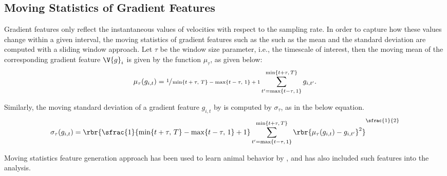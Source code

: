 \subsection{Moving Statistics of Gradient Features}
Gradient features only reflect the instantaneous values of velocities with respect to the sampling rate.
In order to capture how these values change within a given interval, the moving statistics of gradient features such as the such as the mean and the standard deviation are  computed with a sliding window approach.
Let $\tau$ be the window size parameter, i.e., the timescale of interest, then the moving mean of the corresponding gradient feature $\V{g}_{i}$ is given by the function $\mu_\tau$, as given below:
\begin{equation}
	\mu_{\tau}(g_{i,t}) = \sfrac{1}{\min\{t+\tau,\, T\}-\max\{t-\tau,\, 1\}+1} \sum_{t^{\prime}=\max\{t-\tau,\, 1\}}^{\min\{t+\tau,\, T\}} g_{i, t^{\prime}}.
\end{equation}

Similarly, the moving standard deviation of a gradient feature $g_{i,t}$ by is computed by $\sigma_\tau$, as in the below equation.
\begin{equation}
	\sigma_\tau(g_{i,t}) = \rbr{\sfrac{1}{\min\{t+\tau,\, T\}-\max\{t-\tau,\, 1\}+1} \sum_{t^{\prime}=\max\{t-\tau,\, 1\}}^{\min\{t+\tau,\, T\}} \rbr{\mu_{\tau}(g_{i,t}) - g_{i, t^{\prime}}}^2}^{\sfrac{1}{2}}
\end{equation}

Moving statistics feature generation approach has been used to learn animal behavior by \citet{kabra_jaaba_2013}, and \citet{marshall_continuous_2021} has also included such features into the analysis.


